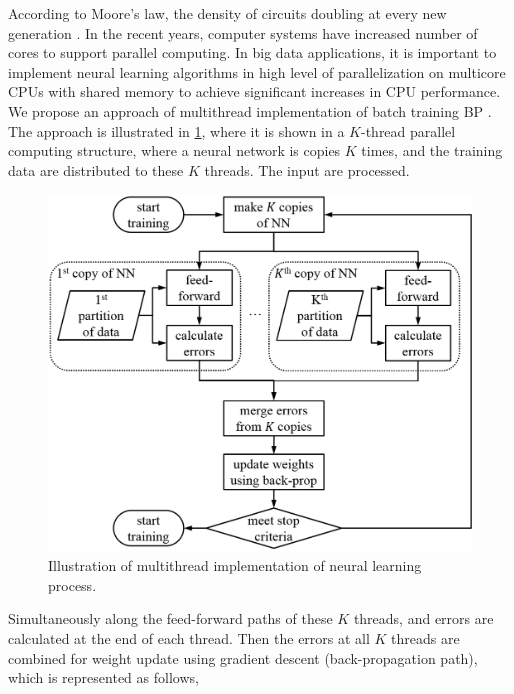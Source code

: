 \documentclass[procedia]{easychair}
\begin{document}
According to Moore’s law, the density of circuits doubling at every new generation \cite{chu2007map}.  In the recent years, computer systems have increased number of cores to support parallel computing.  In big data applications, it is important to implement neural learning algorithms in high level of parallelization on multicore CPUs with shared memory to achieve significant increases in CPU performance.  We propose an approach of multithread implementation of batch training BP \cite{schuessler2011parallel}.  The approach is illustrated in \ref{fig:parallelization}, where it is shown in a $K$-thread parallel computing structure, where a neural network is copies $K$ times, and the training data are distributed to these $K$ threads.  The input are processed.

\begin{figure}[tb]
    \begin{centering}
        \includegraphics[scale=0.5]{../../pic/parallelization.png}
        \caption{Illustration of multithread implementation of neural learning process.}
    \label{fig:parallelization}
	\end{centering}
\end{figure}

Simultaneously along the feed-forward paths of these $K$ threads, and errors are calculated at the end of each thread.  Then the errors at all $K$ threads are combined for weight update using gradient descent (back-propagation path), which is represented as follows,
\end{document}
